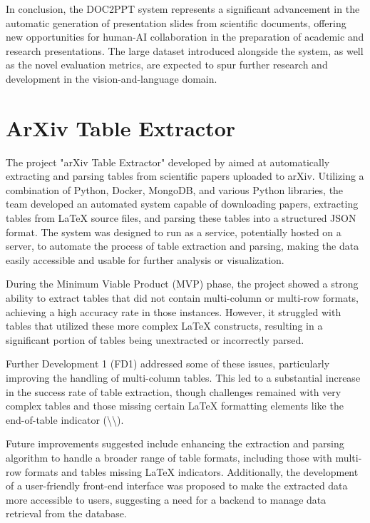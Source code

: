 In conclusion, the DOC2PPT system represents a significant advancement in the automatic generation of presentation slides from scientific documents, offering new opportunities for human-AI collaboration in the preparation of academic and research presentations. The large dataset introduced alongside the system, as well as the novel evaluation metrics, are expected to spur further research and development in the vision-and-language domain.

\section{ArXiv Table Extractor}

The project "arXiv Table Extractor" developed by \citet{Ramsay:2021:BachelorThesis} aimed at automatically extracting and parsing tables from scientific papers uploaded to arXiv. Utilizing a combination of Python, Docker, MongoDB, and various Python libraries, the team developed an automated system capable of downloading papers, extracting tables from \LaTeX{} source files, and parsing these tables into a structured JSON format. The system was designed to run as a service, potentially hosted on a server, to automate the process of table extraction and parsing, making the data easily accessible and usable for further analysis or visualization.

During the Minimum Viable Product (MVP) phase, the project showed a strong ability to extract tables that did not contain multi-column or multi-row formats, achieving a high accuracy rate in those instances. However, it struggled with tables that utilized these more complex \LaTeX{} constructs, resulting in a significant portion of tables being unextracted or incorrectly parsed.

Further Development 1 (FD1) addressed some of these issues, particularly improving the handling of multi-column tables. This led to a substantial increase in the success rate of table extraction, though challenges remained with very complex tables and those missing certain \LaTeX{} formatting elements like the end-of-table indicator (\textbackslash\textbackslash).

Future improvements suggested include enhancing the extraction and parsing algorithm to handle a broader range of table formats, including those with multi-row formats and tables missing \LaTeX{} indicators. Additionally, the development of a user-friendly front-end interface was proposed to make the extracted data more accessible to users, suggesting a need for a backend to manage data retrieval from the database.

